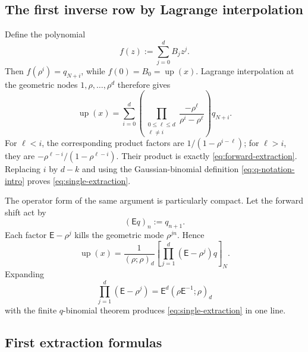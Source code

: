 \documentclass[11pt,oneside]{article}
\theoremstyle{definition}
\theoremstyle{remark}
\newcommand{\up}{\operatorname{up}}
\newcommand{\E}{\mathsf E}
\begin{document}
\subsection{The first inverse row by Lagrange interpolation}

Define the polynomial
\begin{equation}\label{eq:f-polynomial}
 f(z):=\sum_{j=0}^{d}B_jz^j.
\end{equation}
Then \(f(\rho^i)=q_{N+i}\), while \(f(0)=B_0=\up(x)\).  Lagrange
interpolation at the geometric nodes \(1,\rho,\ldots,\rho^d\) therefore gives
\begin{equation}\label{eq:lagrange-zero}
 \up(x)=\sum_{i=0}^{d}
 \left(\prod_{\substack{0\le\ell\le d\\\ell\ne i}}
 \frac{-\rho^\ell}{\rho^i-\rho^\ell}\right)q_{N+i}.
\end{equation}
For \(\ell<i\), the corresponding product factors are
\(1/(1-\rho^{i-\ell})\); for \(\ell>i\), they are
\(-\rho^{\ell-i}/(1-\rho^{\ell-i})\).  Their product is exactly
\eqref{eq:forward-extraction}.  Replacing \(i\) by \(d-k\) and using the
Gaussian-binomial definition \eqref{eq:q-notation-intro} proves
\eqref{eq:single-extraction}.

The operator form of the same argument is particularly compact.  Let the
forward shift act by
\begin{equation}\label{eq:shift}
 (\E q)_n:=q_{n+1}.
\end{equation}
Each factor \(\E-\rho^j\) kills the geometric mode \(\rho^{jn}\).  Hence
\begin{equation}\label{eq:constant-projector}
 \boxed{\displaystyle
 \up(x)=\frac{1}{(\rho;\rho)_d}
 \left[\prod_{j=1}^{d}(\E-\rho^j)q\right]_N.}
\end{equation}
Expanding
\begin{equation}\label{eq:q-product-expand}
 \prod_{j=1}^{d}(\E-\rho^j)
 =\E^d(\rho\E^{-1};\rho)_d
\end{equation}
with the finite \(q\)-binomial theorem produces
\eqref{eq:single-extraction} in one line.

\subsection{First extraction formulas}
\end{document}
